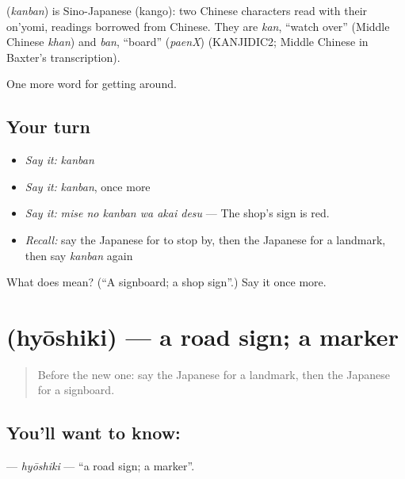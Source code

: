 \begin{cousinweb}
\textbf{} (\emph{kanban}) is Sino-Japanese (kango): two Chinese characters read with their on'yomi, readings borrowed from Chinese. They are \emph{kan}, \textquotedblleft{}watch over\textquotedblright{} (Middle Chinese \emph{khan}) and \emph{ban}, \textquotedblleft{}board\textquotedblright{} (\emph{paenX}) (KANJIDIC2; Middle Chinese in Baxter's transcription).
\end{cousinweb}

\begin{grammarlens}[title={What you've built}]
One more word for getting around.
\end{grammarlens}

\subsection*{Your turn}
\begin{itemize}
\raggedright
  \item \emph{Say it:} \emph{kanban}
  \item \emph{Say it:} \emph{kanban}, once more
  \item \emph{Say it:} \emph{mise no kanban wa akai desu} — The shop's sign is red.
  \item \emph{Recall:} say the Japanese for to stop by, then the Japanese for a landmark, then say \emph{kanban} again
\end{itemize}

\begin{tcolorbox}[breakable,colback=teal!4,colframe=teal!35!black,title={Before you move on}]
What does  mean? (\textquotedblleft{}A signboard; a shop sign\textquotedblright{}.) Say it once more.
\end{tcolorbox}
\section[\texorpdfstring{\ja{ひょうしき} (hyōshiki)}{ひょうしき (hyōshiki)}]{ (hyōshiki) — a road sign; a marker}

\label{lesson:JA-C393-hyoushiki}



\begin{quote}
Before the new one: say the Japanese for a landmark, then the Japanese for a signboard.
\end{quote}

\subsection*{You'll want to know: }
\textbf{} — \emph{hyōshiki} — \textquotedblleft{}a road sign; a marker\textquotedblright{}.


